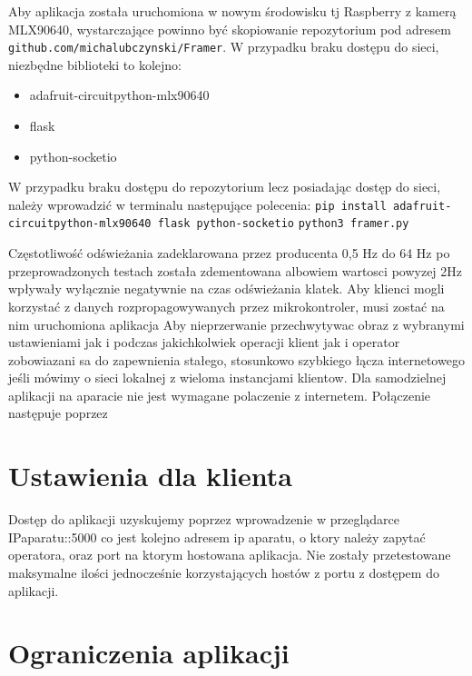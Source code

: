 \documentclass[a4paper,twoside,12pt]{book}
\begin{document}
Aby aplikacja została uruchomiona w nowym środowisku tj Raspberry z kamerą MLX90640, wystarczające powinno być skopiowanie repozytorium pod adresem \lstinline|github.com/michalubczynski/Framer|. W przypadku braku dostępu do sieci, niezbędne biblioteki to kolejno:
\begin{itemize}
\item adafruit-circuitpython-mlx90640
\item flask
\item python-socketio
\end{itemize}
W przypadku braku dostępu do repozytorium lecz posiadając dostęp do sieci, należy wprowadzić w terminalu następujące polecenia:
\newline
\lstinline|pip install adafruit-circuitpython-mlx90640 flask python-socketio|
\newline
\lstinline|python3 framer.py|







 Częstotliwość odświeżania zadeklarowana przez producenta 0,5 Hz do 64 Hz po przeprowadzonych testach została zdementowana albowiem wartosci powyzej 2Hz wpływały wyłącznie negatywnie na czas odświeżania klatek.
Aby klienci mogli korzystać z danych rozpropagowywanych przez mikrokontroler, musi zostać na nim uruchomiona aplikacja 
Aby nieprzerwanie przechwytywac obraz z wybranymi ustawieniami jak i podczas jakichkolwiek operacji klient jak i operator zobowiazani sa do zapewnienia stałego, stosunkowo szybkiego łącza internetowego jeśli mówimy o sieci lokalnej z wieloma instancjami klientow. Dla samodzielnej aplikacji na aparacie nie jest wymagane polaczenie z internetem. Połączenie następuje poprzez 



\chapter{Ustawienia dla klienta}
\label{ch:Ustawienia-dla-klienta}
Dostęp do aplikacji uzyskujemy poprzez wprowadzenie w przeglądarce IPaparatu::5000 co jest kolejno adresem ip aparatu, o ktory należy zapytać operatora, oraz port na ktorym hostowana aplikacja.
Nie zostały przetestowane maksymalne ilości jednocześnie korzystających hostów z portu z dostępem do aplikacji.







\chapter{Ograniczenia aplikacji}
\label{ograniczenia-aplikacji}
\end{document}
